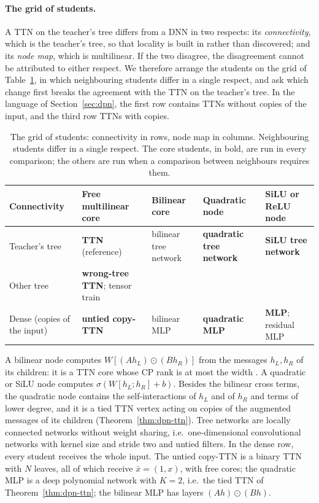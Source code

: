 \documentclass[11pt]{article}
\newcommand{\xb}{\bar{x}}
\theoremstyle{definition}
\numberwithin{equation}{section}
\begin{document}
\paragraph{The grid of students.}
A TTN on the teacher's tree differs from a DNN in two respects: its \emph{connectivity}, which is the teacher's tree, so that locality is built in rather than discovered; and its \emph{node map}, which is multilinear. If the two disagree, the disagreement cannot be attributed to either respect. We therefore arrange the students on the grid of Table~\ref{tab:exp-grid}, in which neighbouring students differ in a single respect, and ask which change first breaks the agreement with the TTN on the teacher's tree. In the language of Section~\ref{sec:dpn}, the first row contains TTNs without copies of the input, and the third row TTNs with copies.

\begin{table}[tbp]
\centering
\footnotesize
\renewcommand{\arraystretch}{1.3}
\begin{tabular}{p{}p{}p{}p{}p{}}
\hline
\raggedright Connectivity & \raggedright Free multilinear core & \raggedright Bilinear core & \raggedright Quadratic node & \raggedright SiLU or ReLU node \tabularnewline
\hline
\raggedright Teacher's tree & \raggedright \textbf{TTN} (reference) & \raggedright bilinear tree network & \raggedright \textbf{quadratic tree network} & \raggedright \textbf{SiLU tree network} \tabularnewline
\raggedright Other tree & \raggedright \textbf{wrong-tree TTN}; tensor train & & & \tabularnewline
\raggedright Dense (copies of the input) & \raggedright \textbf{untied copy-TTN} & \raggedright bilinear MLP & \raggedright \textbf{quadratic MLP} & \raggedright \textbf{MLP}; residual MLP \tabularnewline
\hline
\end{tabular}
\caption{The grid of students: connectivity in rows, node map in columns. Neighbouring students differ in a single respect. The core students, in bold, are run in every comparison; the others are run when a comparison between neighbours requires them.}
\label{tab:exp-grid}
\end{table}

A bilinear node computes $W[(Ah_L)\odot(Bh_R)]$ from the messages $h_L,h_R$ of its children: it is a TTN core whose CP rank is at most the width \citep{pearce2024bilinear}. A quadratic or SiLU node computes $\sigma(W[h_L;h_R]+b)$. Besides the bilinear cross terms, the quadratic node contains the self-interactions of $h_L$ and of $h_R$ and terms of lower degree, and it is a tied TTN vertex acting on copies of the augmented messages of its children (Theorem~\ref{thm:dpn-ttn}). Tree networks are locally connected networks without weight sharing, i.e.\ one-dimensional convolutional networks with kernel size and stride two and untied filters. In the dense row, every student receives the whole input. The untied copy-TTN is a binary TTN with $N$ leaves, all of which receive $\xb=(1,x)$, with free cores; the quadratic MLP is a deep polynomial network with $K=2$, i.e.\ the tied TTN of Theorem~\ref{thm:dpn-ttn}; the bilinear MLP has layers $(Ah)\odot(Bh)$.
\end{document}
